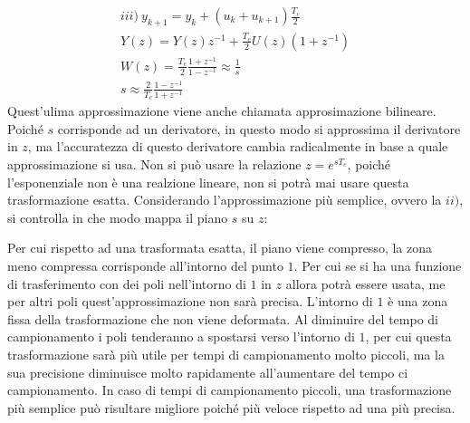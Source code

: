\documentclass{article}
\numberwithin{equation}{subsection}
\begin{document}
\begin{gather}
    iii)\:y_{k+1}=y_k+(u_k+u_{k+1})\displaystyle\frac{T_c}{2}\\
    Y(z)=Y(z)z^{-1}+\displaystyle\frac{T_c}{2}U(z)(1+z^{-1})\\
    W(z)=\displaystyle\frac{T_c}{2}\frac{1+z^{-1}}{1-z^{-1}}\approx\frac{1}{s}\\
    s\approx\displaystyle\frac{2}{T_c}\frac{1-z^{-1}}{1+z^{-1}}
\end{gather}
Quest'ulima approssimazione viene anche chiamata approsimazione bilineare. Poiché $s$ corrisponde ad un derivatore, in questo modo si approssima il derivatore in $z$, ma 
l'accuratezza di questo derivatore cambia radicalmente in base a quale approssimazione si usa. 
Non si può usare la relazione $z=e^{sT_c}$, poiché l'esponenziale non è una realzione lineare, non si potrà mai usare questa trasformazione esatta. 
Considerando l'approssimazione più semplice, ovvero la $ii)$, si controlla in che modo mappa il piano $s$ su $z$:
\begin{center}
\end{center}
Per cui rispetto ad una trasformata esatta, il piano viene compresso, la zona meno compressa corrisponde all'intorno del punto $1$. Per cui se si ha una 
funzione di trasferimento con dei poli nell'intorno di $1$ in $z$ allora potrà essere usata, me per altri poli quest'approssimazione non sarà precisa. 
L'intorno di $1$ è una zona fissa della trasformazione che non viene deformata. Al diminuire del tempo di campionamento i poli tenderanno a spostarsi verso l'intorno di $1$, 
per cui questa trasformazione sarà più utile per tempi di campionamento molto piccoli, ma la sua precisione diminuisce molto rapidamente all'aumentare del tempo ci campionamento. 
In caso di tempi di campionamento piccoli, una trasformazione più semplice può risultare migliore poiché più veloce rispetto ad una più precisa. 
\end{document}
